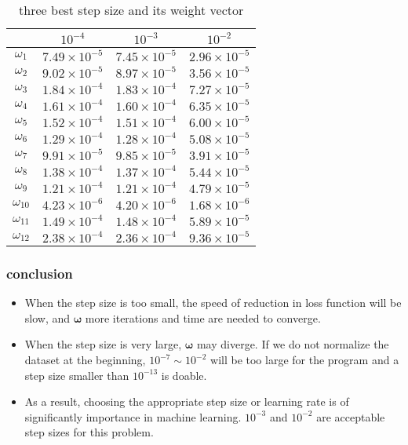 \documentclass[a4paper,11pt]{article}
\begin{document}
\par
\begin{table}[H]
	\begin{center}
		\caption{three best step size and its weight vector}
		\begin{tabular}{cccc}
			\toprule[2pt] 
			& $10^{-4}$ &$10^{-3}$ & $10^{-2}$\\ 
			\hline 
			$\omega_{1}$&$7.49\times 10^{-5}$&$7.45\times 10^{-5}$	&$2.96\times 10^{-5}$ 	\\
			$\omega_{2}$&$9.02\times 10^{-5}$&$8.97\times 10^{-5}$	&$3.56\times 10^{-5}$	\\
			$\omega_{3}$&$1.84\times 10^{-4}$&$1.83\times 10^{-4}$	&$7.27\times 10^{-5}$	\\
			$\omega_{4}$&$1.61\times 10^{-4}$&$1.60\times 10^{-4}$	&$6.35\times 10^{-5}$	\\
			$\omega_{5}$&$1.52\times 10^{-4}$&$1.51\times 10^{-4}$	&$6.00\times 10^{-5}$	\\
			$\omega_{6}$&$1.29\times 10^{-4}$&$1.28\times 10^{-4}$	&$5.08\times 10^{-5}$	\\
			$\omega_{7}$&$9.91\times 10^{-5}$&$9.85\times 10^{-5}$	&$3.91\times 10^{-5}$	\\
			$\omega_{8}$&$1.38\times 10^{-4}$&$1.37\times 10^{-4}$	&$5.44\times 10^{-5}$	\\
			$\omega_{9}$&$1.21\times 10^{-4}$&$1.21\times 10^{-4}$	&$4.79\times 10^{-5}$	\\
			$\omega_{10}$&$4.23\times 10^{-6}$&$4.20\times 10^{-6}$	&$1.68\times 10^{-6}$	\\
			$\omega_{11}$&$1.49\times 10^{-4}$&$1.48\times 10^{-4}$	&$5.89\times 10^{-5}$	\\
			$\omega_{12}$&$2.38\times 10^{-4}$&$2.36\times 10^{-4}$	&$9.36\times 10^{-5}$	\\
			\bottomrule[2pt]
		\end{tabular} 
	\end{center}
\end{table}
\subsubsection*{conclusion}
\begin{itemize}
	\item When the step size is too small, the speed of reduction in loss function will be slow, and $\bm{\omega}$ more iterations and time are needed to converge.
	\item When the step size is very large, $\bm{\omega}$ may diverge. If we do not normalize the dataset at the beginning, $10^{-7}\sim 10^{-2}$ will be too large for the program and a step size smaller than $10^{-13}$ is doable.
	\item As a result, choosing the appropriate step size or learning rate is of significantly importance in machine learning.  $10^{-3}$ and $10^{-2}$ are acceptable step sizes for this problem.
\end{itemize}
\par
\end{document}
